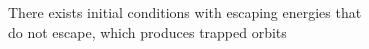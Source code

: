 \documentclass[preview]{standalone}
\begin{document}
There exists initial conditions with escaping energies that\\do not escape, which produces trapped orbits\\
\end{document}

